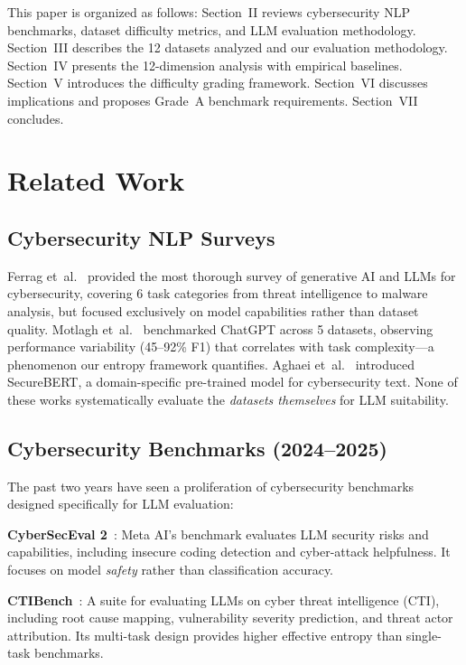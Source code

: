 \documentclass[journal]{IEEEtran}
\begin{document}
This paper is organized as follows: Section~II reviews cybersecurity NLP benchmarks, dataset difficulty metrics, and LLM evaluation methodology. Section~III describes the 12 datasets analyzed and our evaluation methodology. Section~IV presents the 12-dimension analysis with empirical baselines. Section~V introduces the difficulty grading framework. Section~VI discusses implications and proposes Grade~A benchmark requirements. Section~VII concludes.

\section{Related Work}

\subsection{Cybersecurity NLP Surveys}
Ferrag et~al.~\cite{ferrag2024} provided the most thorough survey of generative AI and LLMs for cybersecurity, covering 6 task categories from threat intelligence to malware analysis, but focused exclusively on model capabilities rather than dataset quality. Motlagh et~al.~\cite{motlagh2024} benchmarked ChatGPT across 5 datasets, observing performance variability (45--92\% F1) that correlates with task complexity---a phenomenon our entropy framework quantifies. Aghaei et~al.~\cite{aghaei2023} introduced SecureBERT, a domain-specific pre-trained model for cybersecurity text. None of these works systematically evaluate the \emph{datasets themselves} for LLM suitability.

\subsection{Cybersecurity Benchmarks (2024--2025)}
The past two years have seen a proliferation of cybersecurity benchmarks designed specifically for LLM evaluation:

\textbf{CyberSecEval 2}~\cite{cyberseceval2024}: Meta AI's benchmark evaluates LLM security risks and capabilities, including insecure coding detection and cyber-attack helpfulness. It focuses on model \emph{safety} rather than classification accuracy.

\textbf{CTIBench}~\cite{ctibench2024}: A suite for evaluating LLMs on cyber threat intelligence (CTI), including root cause mapping, vulnerability severity prediction, and threat actor attribution. Its multi-task design provides higher effective entropy than single-task benchmarks.
\end{document}
